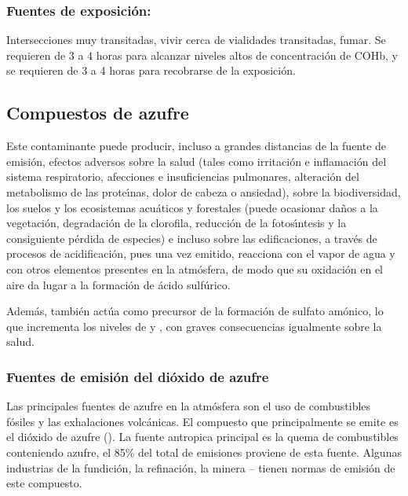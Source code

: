 \subsubsection{Fuentes de exposici\'on:}
Intersecciones muy transitadas, vivir cerca de vialidades transitadas, fumar.
Se requieren de 3 a 4 horas para alcanzar niveles altos de concentraci\'on de COHb, y
se requieren de 3 a 4 horas para recobrarse de la exposici\'on.

\subsection{Compuestos de azufre}
Este contaminante puede producir, incluso a grandes distancias de la fuente de emisi\'on, efectos adversos sobre la salud (tales como irritaci\'on e inflamaci\'on del sistema respiratorio, afecciones e insuficiencias pulmonares, alteraci\'on del metabolismo de las prote\'{\i}nas, dolor de cabeza o ansiedad), sobre la biodiversidad, los suelos y los ecosistemas acu\'aticos y forestales (puede ocasionar da\~nos a la vegetaci\'on, degradaci\'on de la clorofila, reducci\'on de la fotos\'{\i}ntesis y la consiguiente p\'erdida de especies) e incluso sobre las edificaciones, a trav\'es de procesos de acidificaci\'on, pues una vez emitido, reacciona con el vapor de agua y con otros elementos presentes en la atm\'osfera, de modo que su oxidaci\'on en el aire da lugar a la formaci\'on de \'acido sulf\'urico.

Adem\'as, tambi\'en act\'ua como precursor de la formaci\'on de sulfato am\'onico, lo que incrementa los niveles de  y , con graves consecuencias igualmente sobre la salud.

\subsubsection{Fuentes de emisi\'on del di\'oxido de azufre} Las principales fuentes de azufre en la atm\'osfera son el uso de combustibles f\'osiles y las exhalaciones volc\'anicas. El compuesto que principalmente se emite es el di\'oxido de azufre (). La fuente  \gls{antropica} principal es la quema de combustibles conteniendo azufre, el 85\% del total de emisiones proviene de esta fuente. Algunas industrias de la fundici\'on, la refinaci\'on, la minera --  tienen normas de emisi\'on de este compuesto.

